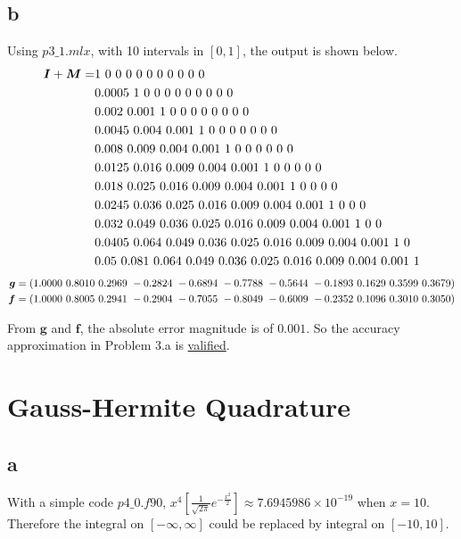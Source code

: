 \documentclass[letterpaper,10pt]{article}
\begin{document}
\subsection{b}
Using $p3\_1.mlx$, with 10 intervals in $\left[0,1\right]$, the output is shown below. 
\begin{align}
  \bm{I}+\bm{M} =& 1~0~0~0~0~0~0~0~0~0~0\notag\\
    &0.0005~1~0~0~0~0~0~0~0~0~0\notag\\
    &0.002~0.001~1~0~0~0~0~0~0~0~0\notag\\
    &0.0045~0.004~0.001~1~0~0~0~0~0~0~0\notag\\
    &0.008~0.009~0.004~0.001~1~0~0~0~0~0~0\notag\\
    &0.0125~0.016~0.009~0.004~0.001~1~0~0~0~0~0\notag\\
    &0.018~0.025~0.016~0.009~0.004~0.001~1~0~0~0~0\notag\\
    &0.0245~0.036~0.025~0.016~0.009~0.004~0.001~1~0~0~0\notag\\
    &0.032~0.049~0.036~0.025~0.016~0.009~0.004~0.001~1~0~0\notag\\
    &0.0405~0.064~0.049~0.036~0.025~0.016~0.009~0.004~0.001~1~0\notag\\
    &0.05~0.081~0.064~0.049~0.036~0.025~0.016~0.009~0.004~0.001~1\notag
\end{align}
\begin{align}
  \bm{g} &= \left(1.0000~0.8010~0.2969~-0.2824~-0.6894~-0.7788~-0.5644~-0.1893~0.1629~0.3599~0.3679\right)\notag\\
  \bm{f} &= \left(1.0000~0.8005~0.2941~-0.2904~-0.7055~-0.8049~-0.6009~-0.2352~0.1096~0.3010~0.3050\right)\notag
\end{align}

From $\bm{{g}}$ and $\bm{f}$, the absolute error magnitude is of $0.001$. So the accuracy approximation in Problem 3.a is \underline{valified}. 
\section{Gauss-Hermite Quadrature}
\subsection{a}
With a simple code $p4\_0.f90$, $x^4\left[\frac{1}{\sqrt{2\pi}}e^{-\frac{x^2}{2}}\right] \approx 7.6945986\times 10^{-19}$ when $x=10$. 
Therefore the integral on $\left[-\infty,\infty\right]$ could be replaced by integral on $\left[-10,10\right]$. 
\end{document}
